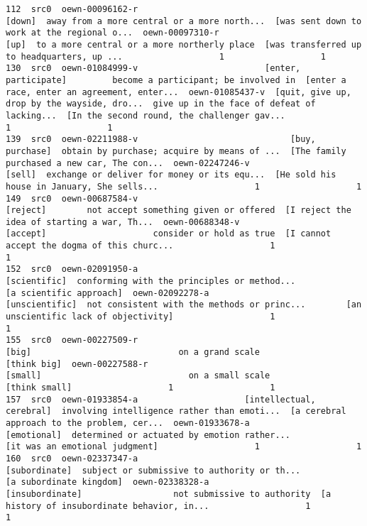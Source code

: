 \documentclass[a4paper,10pt,onecolumn,oneside,openright]{article}
\begin{document}
\begin{verbatim}
112  src0  oewn-00096162-r                                       [down]  away from a more central or a more north...  [was sent down to work at the regional o...  oewn-00097310-r                                         [up]  to a more central or a more northerly place  [was transferred up to headquarters, up ...                   1                   1
130  src0  oewn-01084999-v                         [enter, participate]         become a participant; be involved in  [enter a race, enter an agreement, enter...  oewn-01085437-v  [quit, give up, drop by the wayside, dro...  give up in the face of defeat of lacking...  [In the second round, the challenger gav...                   1                   1
139  src0  oewn-02211988-v                              [buy, purchase]  obtain by purchase; acquire by means of ...  [The family purchased a new car, The con...  oewn-02247246-v                                       [sell]  exchange or deliver for money or its equ...  [He sold his house in January, She sells...                   1                   1
149  src0  oewn-00687584-v                                     [reject]        not accept something given or offered  [I reject the idea of starting a war, Th...  oewn-00688348-v                                     [accept]                     consider or hold as true  [I cannot accept the dogma of this churc...                   1                   1
152  src0  oewn-02091950-a                                 [scientific]  conforming with the principles or method...                      [a scientific approach]  oewn-02092278-a                               [unscientific]  not consistent with the methods or princ...        [an unscientific lack of objectivity]                   1                   1
155  src0  oewn-00227509-r                                        [big]                             on a grand scale                                  [think big]  oewn-00227588-r                                      [small]                             on a small scale                                [think small]                   1                   1
157  src0  oewn-01933854-a                     [intellectual, cerebral]  involving intelligence rather than emoti...  [a cerebral approach to the problem, cer...  oewn-01933678-a                                  [emotional]  determined or actuated by emotion rather...               [it was an emotional judgment]                   1                   1
160  src0  oewn-02337347-a                                [subordinate]  subject or submissive to authority or th...                      [a subordinate kingdom]  oewn-02338328-a                              [insubordinate]                  not submissive to authority  [a history of insubordinate behavior, in...                   1                   1
\end{verbatim}
\end{document}
